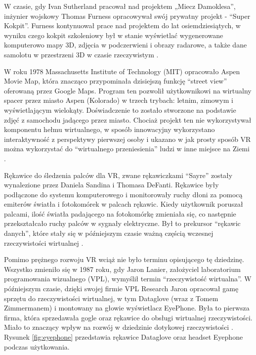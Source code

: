 W czasie, gdy Ivan Sutherland pracował nad projektem „Miecz Damoklesa”, inżynier wojskowy Thomas Furness opracowywał swój prywatny projekt - ``Super Kokpit''. Furness kontynuował prace nad projektem do lat osiemdziesiątych, w wyniku czego kokpit szkoleniowy był w stanie wyświetlać wygenerowane komputerowo mapy 3D, zdjęcia w podczerwieni i obrazy radarowe, a także dane samolotu w przestrzeni 3D w czasie rzeczywistym \citep{website:digitaltrends}.

W roku 1978 Massachusetts Institute of Technology (MIT) opracowało Aspen Movie Map, która znacząco przypominała dzisiejszą funkcję ``street view'' oferowaną przez Google Maps. Program ten pozwolił użytkownikowi na wirtualny spacer przez miasto Aspen (Kolorado) w trzech trybach: letnim, zimowym i wyświetlającym wielokąty. Doświadczenie to zostało stworzone na podstawie zdjęć z samochodu jadącego przez miasto. Chociaż projekt ten nie wykorzystywał komponentu hełmu wirtualnego,  w sposób innowacyjny wykorzystano interaktywność z perspektywy pierwszej osoby i ukazano w jak prosty sposób VR można wykorzystać do ``wirtualnego przeniesienia'' ludzi w inne miejsce na Ziemi \citep{website:digitaltrends}.

Rękawice do śledzenia palców dla VR, zwane rękawiczkami ``Sayre'' zostały wynalezione przez Daniela Sandina i Thomasa DeFanti. Rękawice były podłączone do systemu komputerowego i monitorowały ruchy dłoni za pomocą emiterów światła i fotokomórek w palcach rękawic. Kiedy użytkownik poruszał palcami, ilość światła padającego na fotokomórkę zmieniała się, co następnie przekształcało ruchy palców w sygnały elektryczne. Był to prekursor ``rękawic danych'', które stały się w późniejszym czasie ważną częścią wczesnej rzeczywistości wirtualnej \citep{website:virtualspeech}.

Pomimo prężnego rozwoju VR wciąż nie było terminu opisującego tę dziedzinę. Wszystko zmieniło się w 1987 roku, gdy Jaron Lanier, założyciel laboratorium programowania wizualnego (VPL), wymyślił termin ``rzeczywistość wirtualna''. W późniejszym czasie, dzięki swojej firmie VPL Research Jaron opracował gamę sprzętu do rzeczywistości wirtualnej, w tym Dataglove (wraz z Tomem Zimmermanem) i montowany na głowie wyświetlacz  EyePhone. Była to pierwsza firma, która sprzedawała gogle oraz rękawice do obsługi wirtualnej rzeczywistości. Miało to znaczący wpływ na rozwój w dziedzinie dotykowej rzeczywistości \citep{website:learng2, interactivemedia}. Rysunek \ref{fig:eyephone} przedstawia rękawice Dataglove oraz headset Eyephone podczas użytkowania.

